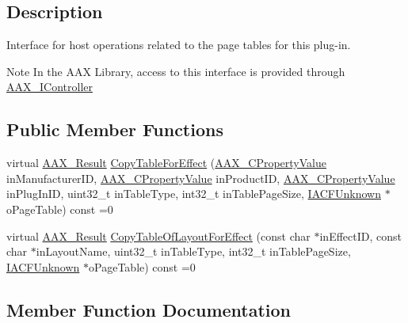 \subsection{Description}
Interface for host operations related to the page tables for this plug-\/in. 

\begin{DoxyNote}{Note}
In the A\+AX Library, access to this interface is provided through \mbox{\hyperlink{a01789}{A\+A\+X\+\_\+\+I\+Controller}} 
\end{DoxyNote}
\subsection*{Public Member Functions}
\begin{DoxyCompactItemize}
\item 
virtual \mbox{\hyperlink{a00392_a4d8f69a697df7f70c3a8e9b8ee130d2f}{A\+A\+X\+\_\+\+Result}} \mbox{\hyperlink{a01733_a30b6356226881d6d60fb26aabea19d76}{Copy\+Table\+For\+Effect}} (\mbox{\hyperlink{a00392_ab247c0d8686c14e05cbb567ef276f249}{A\+A\+X\+\_\+\+C\+Property\+Value}} in\+Manufacturer\+ID, \mbox{\hyperlink{a00392_ab247c0d8686c14e05cbb567ef276f249}{A\+A\+X\+\_\+\+C\+Property\+Value}} in\+Product\+ID, \mbox{\hyperlink{a00392_ab247c0d8686c14e05cbb567ef276f249}{A\+A\+X\+\_\+\+C\+Property\+Value}} in\+Plug\+In\+ID, uint32\+\_\+t in\+Table\+Type, int32\+\_\+t in\+Table\+Page\+Size, \mbox{\hyperlink{a01409}{I\+A\+C\+F\+Unknown}} $\ast$o\+Page\+Table) const =0
\item 
virtual \mbox{\hyperlink{a00392_a4d8f69a697df7f70c3a8e9b8ee130d2f}{A\+A\+X\+\_\+\+Result}} \mbox{\hyperlink{a01733_a75965c6121b8041746e0a39f46d6fa8d}{Copy\+Table\+Of\+Layout\+For\+Effect}} (const char $\ast$in\+Effect\+ID, const char $\ast$in\+Layout\+Name, uint32\+\_\+t in\+Table\+Type, int32\+\_\+t in\+Table\+Page\+Size, \mbox{\hyperlink{a01409}{I\+A\+C\+F\+Unknown}} $\ast$o\+Page\+Table) const =0
\end{DoxyCompactItemize}


\subsection{Member Function Documentation}
\mbox{\label{a01733_a30b6356226881d6d60fb26aabea19d76}} 
